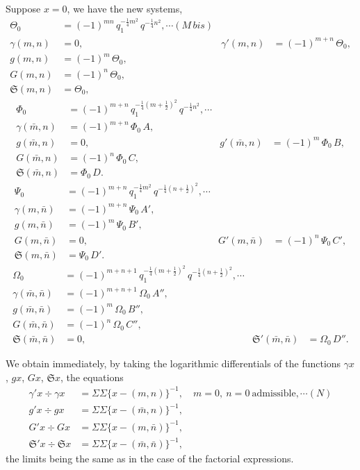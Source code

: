 \documentclass[12pt,a4paper]{article}
\newcommand{\fS}{\mathfrak{S}}
\newcommand{\mn}{(m,n)}
\newcommand{\mbn}{(\bar m,n)}
\newcommand{\mnb}{(m,\bar n)}
\newcommand{\mbnb}{(\bar m,\bar n)}
\begin{document}
Suppose $x = 0$, we have the new systems,
\begin{align*}
\Theta_0 &= (-1)^{mn}\,q_1^{-\frac{1}{4}m^2}\,q^{-\frac{1}{4}n^2}, \cdots(M\,bis)\\
\gamma\mn &= 0,\quad &\gamma'\mn &= (-1)^{m+n}\,\Theta_0,\\
g\mn &= (-1)^m\,\Theta_0,\\
G\mn &= (-1)^n\,\Theta_0,\\
\fS\mn &= \Theta_0,
\end{align*}
\begin{align*}
\Phi_0 &= (-1)^{m+n}\,q_1^{-\frac{1}{4}(m+\frac{1}{2})^2}\,q^{-\frac{1}{4}n^2}, \cdots\\
\gamma\mbn &= (-1)^{m+n}\,\Phi_0\,A,\\
g\mbn &= 0,\quad &g'\mbn &= (-1)^m\,\Phi_0\,B,\\
G\mbn &= (-1)^n\,\Phi_0\,C,\\
\fS\mbn &= \Phi_0\,D.
\end{align*}
\begin{align*}
\Psi_0 &= (-1)^{m+n}\,q_1^{-\frac{1}{4}m^2}\,q^{-\frac{1}{4}(n+\frac{1}{2})^2}, \cdots\\
\gamma\mnb &= (-1)^{m+n}\,\Psi_0\,A',\\
g\mnb &= (-1)^m\,\Psi_0\,B',\\
G\mnb &= 0,\quad &G'\mnb &= (-1)^n\,\Psi_0\,C',\\
\fS\mnb &= \Psi_0\,D'.
\end{align*}
\begin{align*}
\Omega_0 &= (-1)^{m+n+1}\,q_1^{-\frac{1}{4}(m+\frac{1}{2})^2}\,q^{-\frac{1}{4}(n+\frac{1}{2})^2}, \cdots\\
\gamma\mbnb &= (-1)^{m+n+1}\,\Omega_0\,A'',\\
g\mbnb &= (-1)^m\,\Omega_0\,B'',\\
G\mbnb &= (-1)^n\,\Omega_0\,C'',\\
\fS\mbnb &= 0,\quad &\fS'\mbnb &= \Omega_0\,D''.
\end{align*}

We obtain immediately, by taking the logarithmic differentials of the functions $\gamma x$, $g x$, $G x$, $\fS x$, the equations
\begin{align*}
\gamma' x \div \gamma x &= \Sigma\Sigma\{x - \mn\}^{-1}, \quad m=0,\ n=0\ \text{admissible}, \cdots(N)\\
g' x \div g x &= \Sigma\Sigma\{x - \mbn\}^{-1},\\
G' x \div G x &= \Sigma\Sigma\{x - \mnb\}^{-1},\\
\fS' x \div \fS x &= \Sigma\Sigma\{x - \mbnb\}^{-1},
\end{align*}
the limits being the same as in the case of the factorial expressions.
\end{document}
